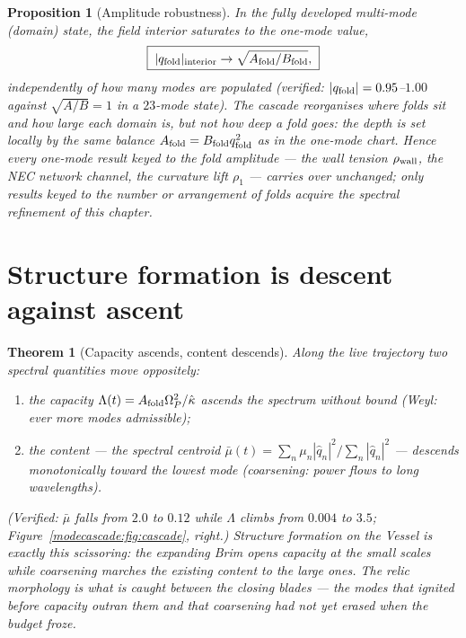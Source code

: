 \documentclass[11pt,a4paper,oneside]{book}
\newcommand{\Op}{\Omega_P}
\newcommand{\qf}{q_{\rm fold}}
\newcommand{\Afold}{A_{\rm fold}}
\newcommand{\Bfold}{B_{\rm fold}}
\newcommand{\kw}{\hat\kappa}
\theoremstyle{plain}
\newtheorem{proposition}{Proposition}[chapter]
\newtheorem{theorem}{Theorem}[chapter]
\theoremstyle{definition}
\theoremstyle{remark}
\begin{document}
\begin{proposition}[Amplitude robustness]\label{modecascade:prop:amp}
In the fully developed multi-mode (domain) state, the field interior saturates to the one-mode value,
\begin{equation}
\boxed{\;|\qf|_{\rm interior}\to\sqrt{\Afold/\Bfold},\;}
\end{equation}
independently of how many modes are populated (verified: $|\qf|=0.95$--$1.00$ against $\sqrt{A/B}=1$
in a $23$-mode state). The cascade reorganises \emph{where} folds sit and \emph{how large} each domain
is, but not \emph{how deep} a fold goes: the depth is set locally by the same balance
$\Afold=\Bfold\qf^2$ as in the one-mode chart. Hence every one-mode result keyed to the fold
\emph{amplitude} --- the wall tension $\rho_{\rm wall}$, the NEC network channel, the curvature lift
$\rho_1$ --- carries over unchanged; only results keyed to the \emph{number or arrangement} of folds
acquire the spectral refinement of this chapter.
\end{proposition}

\section{Structure formation is descent against ascent}

\begin{theorem}[Capacity ascends, content descends]\label{modecascade:thm:descent}
Along the live trajectory two spectral quantities move oppositely:
\begin{enumerate}[label=(\roman*),leftmargin=1.8em,itemsep=2pt]
\item the \emph{capacity} $\Lambda(t)=\Afold\Op^2/\kw$ ascends the spectrum without bound (Weyl:
ever more modes admissible);
\item the \emph{content} --- the spectral centroid
$\bar\mu(t)=\sum_n\mu_n|\hat q_n|^2/\sum_n|\hat q_n|^2$ --- descends monotonically toward the lowest
mode (coarsening: power flows to long wavelengths).
\end{enumerate}
(Verified: $\bar\mu$ falls from $2.0$ to $0.12$ while $\Lambda$ climbs from $0.004$ to $3.5$;
Figure~\ref{modecascade:fig:cascade}, right.) Structure formation on the Vessel is exactly this scissoring: the
expanding Brim opens capacity at the small scales while coarsening marches the existing content to the
large ones. The relic morphology is what is caught between the closing blades --- the modes that
ignited before capacity outran them and that coarsening had not yet erased when the budget froze.
\end{theorem}
\end{document}
